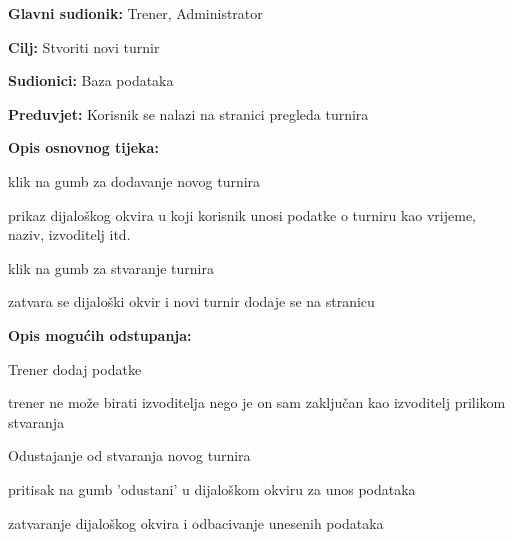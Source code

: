 					\noindent {}
					\begin{packed_item}
	
						\item \textbf{Glavni sudionik: }Trener, Administrator
						\item  \textbf{Cilj: } Stvoriti novi turnir
						\item  \textbf{Sudionici: } Baza podataka
						\item  \textbf{Preduvjet: } Korisnik se nalazi na stranici pregleda turnira
						\item  \textbf{Opis osnovnog tijeka:}
						
						\item[] \begin{packed_enum}
	
							\item klik na gumb za dodavanje novog turnira
							\item prikaz dijaloškog okvira u koji korisnik unosi podatke o turniru kao vrijeme, naziv, izvoditelj itd.
							\item klik na gumb za stvaranje turnira
							\item zatvara se dijaloški okvir i novi turnir dodaje se na stranicu
							
						\end{packed_enum}
						
						\item  \textbf{Opis mogućih odstupanja:}
						
						\item[] \begin{packed_item}
							
							\item[2.a]Trener dodaj podatke
							\item[] \begin{packed_enum}
								
								\item trener ne može birati izvoditelja nego je on sam zaključan kao izvoditelj prilikom stvaranja
								
								
							\end{packed_enum}
						
						
							\item[3.a] Odustajanje od stvaranja novog turnira
							\item[] \begin{packed_enum}
								
								\item pritisak na gumb 'odustani' u dijaloškom okviru za unos podataka
								\item zatvaranje dijaloškog okvira i odbacivanje unesenih podataka
								
							\end{packed_enum}
							
						\end{packed_item}
					\end{packed_item}
					

